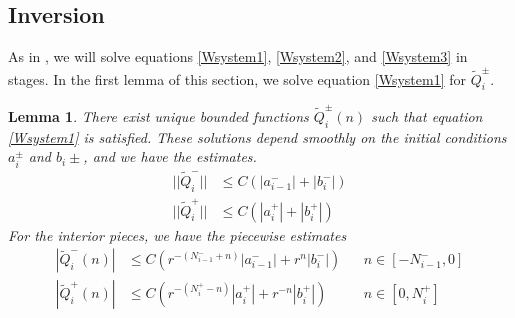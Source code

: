 \documentclass[12pt]{elsarticle}
\newtheorem{lemma}{Lemma}
\begin{document}
\subsection{Inversion}

As in \cite{Sandstede1997}, we will solve equations \eqref{Wsystem1}, \eqref{Wsystem2}, and \eqref{Wsystem3} in stages. In the first lemma of this section, we solve equation \eqref{Wsystem1} for $\tilde{Q}_i^\pm$. 

\begin{lemma}\label{inv1}
There exist unique bounded functions $\tilde{Q}_i^\pm(n)$ such that equation \eqref{Wsystem1} is satisfied. These solutions depend smoothly on the initial conditions $a_i^\pm$ and $b_i\pm$, and we have the estimates.
\begin{equation}\label{Wipmest}
\begin{aligned}
||\tilde{Q}_i^-|| &\leq C (|a_{i-1}^-| + |b_i^-|) \\
||\tilde{Q}_i^+|| &\leq C (|a_i^+| + |b_i^+| )
\end{aligned}
\end{equation}
For the interior pieces, we have the piecewise estimates
\begin{equation}\label{Wipiecewise}
\begin{aligned}
|\tilde{Q}_i^-(n)| &\leq C (r^{-(N_{i-1}^- + n)}|a_{i-1}^-| + r^n|b_i^-|) && n \in [-N_{i-1}^-, 0] \\
|\tilde{Q}_i^+(n)| &\leq C (r^{-(N_i^+ - n)}|a_i^+| + r^{-n}|b_i^+| ) && n \in [0, N_i^+] 
\end{aligned}
\end{equation}


\end{lemma}
\end{document}
